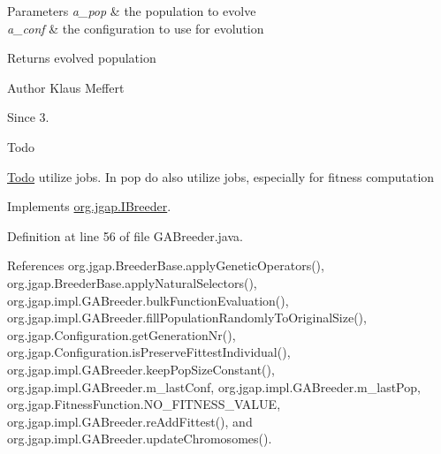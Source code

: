 \begin{DoxyParams}{Parameters}
{\em a\-\_\-pop} & the population to evolve \\
\hline
{\em a\-\_\-conf} & the configuration to use for evolution\\
\hline
\end{DoxyParams}
\begin{DoxyReturn}{Returns}
evolved population
\end{DoxyReturn}
\begin{DoxyAuthor}{Author}
Klaus Meffert 
\end{DoxyAuthor}
\begin{DoxySince}{Since}
3. 
\end{DoxySince}
\begin{DoxyRefDesc}{Todo}
\item[\hyperlink{todo__todo000165}{Todo}]utilize jobs. In pop do also utilize jobs, especially for fitness computation \end{DoxyRefDesc}


Implements \hyperlink{interfaceorg_1_1jgap_1_1_i_breeder_a3acfba66e149a2de2d9496fe11530fe7}{org.\-jgap.\-I\-Breeder}.



Definition at line 56 of file G\-A\-Breeder.\-java.



References org.\-jgap.\-Breeder\-Base.\-apply\-Genetic\-Operators(), org.\-jgap.\-Breeder\-Base.\-apply\-Natural\-Selectors(), org.\-jgap.\-impl.\-G\-A\-Breeder.\-bulk\-Function\-Evaluation(), org.\-jgap.\-impl.\-G\-A\-Breeder.\-fill\-Population\-Randomly\-To\-Original\-Size(), org.\-jgap.\-Configuration.\-get\-Generation\-Nr(), org.\-jgap.\-Configuration.\-is\-Preserve\-Fittest\-Individual(), org.\-jgap.\-impl.\-G\-A\-Breeder.\-keep\-Pop\-Size\-Constant(), org.\-jgap.\-impl.\-G\-A\-Breeder.\-m\-\_\-last\-Conf, org.\-jgap.\-impl.\-G\-A\-Breeder.\-m\-\_\-last\-Pop, org.\-jgap.\-Fitness\-Function.\-N\-O\-\_\-\-F\-I\-T\-N\-E\-S\-S\-\_\-\-V\-A\-L\-U\-E, org.\-jgap.\-impl.\-G\-A\-Breeder.\-re\-Add\-Fittest(), and org.\-jgap.\-impl.\-G\-A\-Breeder.\-update\-Chromosomes().



